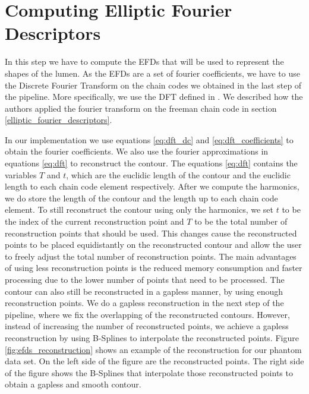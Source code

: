 \documentclass[thesis.tex]{subfiles}
\begin{document}
      

\section{Computing Elliptic Fourier Descriptors}
In this step we have to compute the EFDs that will be used to represent the shapes of the lumen. As the EFDs are a set of fourier coefficients, we have to use the Discrete Fourier Transform on the chain codes we obtained in the last step of the pipeline. More specifically, we use the DFT defined in \cite{giardinia}. We described how the authors applied the fourier transform on the freeman chain code in section \ref{elliptic_fourier_descriptors}. 

In our implementation we use equations \ref{eq:dft_dc} and \ref{eq:dft_coefficients} to obtain the fourier coefficients. We also use the fourier approximations in equations \ref{eq:dft} to reconstruct the contour. The equations \ref{eq:dft} contains the variables $T$ and $t$, which are the euclidic length of the contour and the euclidic length to each chain code element respectively. After we compute the harmonics, we do store the length of the contour and the length up to each chain code element. To still reconstruct the contour using only the harmonics, we set $t$ to be the index of the current reconstruction point and $T$ to be the total number of reconstruction points that should be used. This changes cause the reconstructed points to be placed equidistantly on the reconstructed contour and allow the user to freely adjust the total number of reconstruction points. The main advantages of using less reconstruction points is the reduced memory consumption and faster processing due to the lower number of points that need to be processed. The contour can also still be reconstructed in a gapless manner, by using enough reconstruction points. We do a gapless reconstruction in the next step of the pipeline, where we fix the overlapping of the reconstructed contours. However, instead of increasing the number of reconstructed points, we achieve a gapless reconstruction by using B-Splines to interpolate the reconstructed points. Figure \ref{fig:efds_reconstruction} shows an example of the reconstruction for our phantom data set. On the left side of the figure are the reconstructed points. The right side of the figure shows the B-Splines that interpolate those reconstructed points to obtain a gapless and smooth contour.  \\ 
\end{document}
